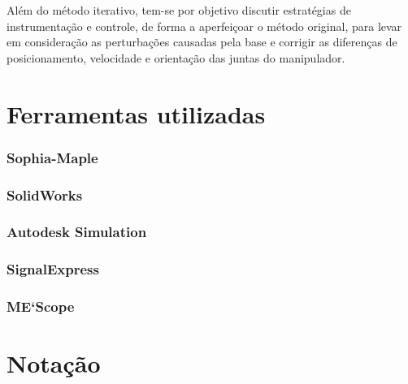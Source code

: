 Além do método iterativo, tem-se por objetivo discutir estratégias de
instrumentação e controle, de forma a aperfeiçoar o método original, para levar
em consideração as perturbações causadas pela base e corrigir as diferenças de
posicionamento, velocidade e orientação das juntas do manipulador.


\section{Ferramentas utilizadas}



\subsubsection{Sophia-Maple}

\subsubsection{SolidWorks}

\subsubsection{Autodesk Simulation}

\subsubsection{SignalExpress}

\subsubsection{ME`Scope}


\section{Notação}


